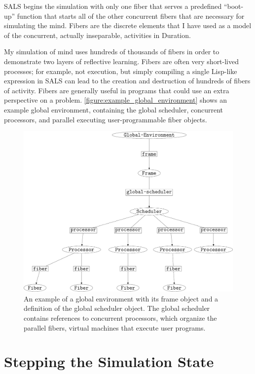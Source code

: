 SALS begins the simulation with only one fiber that serves a
predefined ``boot-up'' function that starts all of the other
concurrent fibers that are necessary for simulating the mind.  Fibers
are the discrete elements that I have used as a model of the
concurrent, actually inseparable, activities in Duration.

My simulation of mind uses hundreds of thousands of fibers in order to
demonstrate two layers of reflective learning.  Fibers are often very
short-lived processes; for example, not execution, but simply
compiling a single Lisp-like expression in SALS can lead to the
creation and destruction of hundreds of fibers of activity.  Fibers
are generally useful in programs that could use an extra perspective
on a problem.  {\mbox{\autoref{figure:example_global_environment}}}
shows an example global environment, containing the global scheduler,
concurrent processors, and parallel executing user-programmable fiber
objects.
\begin{figure}
\center
\includegraphics[width=12cm]{gfx/example_global_environment}
\caption[An example of a global environment with concurrent processors
  and parallel fibers.]{An example of a global environment with its
  frame object and a definition of the global scheduler object.  The
  global scheduler contains references to concurrent processors, which
  organize the parallel fibers, virtual machines that execute user
  programs.}
\label{figure:example_global_environment}
\end{figure}

\section{Stepping the Simulation State}

